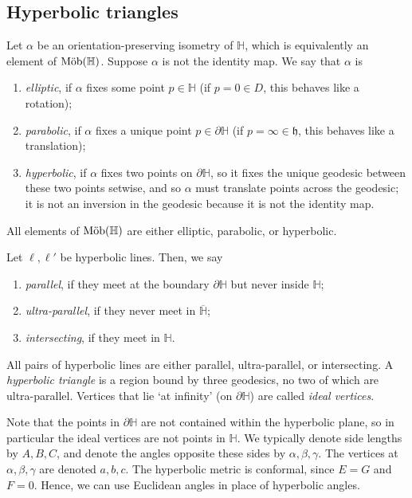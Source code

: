 \subsection{Hyperbolic triangles}
\begin{definition}
	Let \( \alpha \) be an orientation-preserving isometry of \( \mathbb H \), which is equivalently an element of \( \text{M\"ob}(\mathbb H) \).
	Suppose \( \alpha \) is not the identity map.
	We say that \( \alpha \) is
	\begin{enumerate}
		\item \textit{elliptic}, if \( \alpha \) fixes some point \( p \in \mathbb H \) (if \( p = 0 \in D \), this behaves like a rotation);
		\item \textit{parabolic}, if \( \alpha \) fixes a unique point \( p \in \partial \mathbb H \) (if \( p = \infty \in \mathfrak{h} \), this behaves like a translation);
		\item \textit{hyperbolic}, if \( \alpha \) fixes two points on \( \partial \mathbb H \), so it fixes the unique geodesic between these two points setwise, and so \( \alpha \) must translate points across the geodesic; it is not an inversion in the geodesic because it is not the identity map.
	\end{enumerate}
	All elements of \( \text{M\"ob}(\mathbb H) \) are either elliptic, parabolic, or hyperbolic.
\end{definition}
\begin{definition}
	Let \( \ell, \ell' \) be hyperbolic lines.
	Then, we say
	\begin{enumerate}
		\item \textit{parallel}, if they meet at the boundary \( \partial \mathbb H \) but never inside \( \mathbb H \);
		\item \textit{ultra-parallel}, if they never meet in \( \overline{\mathbb H} \);
		\item \textit{intersecting}, if they meet in \( \mathbb H \).
	\end{enumerate}
	All pairs of hyperbolic lines are either parallel, ultra-parallel, or intersecting.
	A \textit{hyperbolic triangle} is a region bound by three geodesics, no two of which are ultra-parallel.
	Vertices that lie `at infinity' (on \( \partial \mathbb H \)) are called \textit{ideal vertices}.
\end{definition}
Note that the points in \( \partial \mathbb H \) are not contained within the hyperbolic plane, so in particular the ideal vertices are not points in \( \mathbb H \).
We typically denote side lengths by \( A, B, C \), and denote the angles opposite these sides by \( \alpha, \beta, \gamma \).
The vertices at \( \alpha, \beta, \gamma \) are denoted \( a, b, c \).
The hyperbolic metric is conformal, since \( E = G \) and \( F = 0 \).
Hence, we can use Euclidean angles in place of hyperbolic angles.

